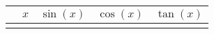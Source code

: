 \documentclass{article}
\newcommand{\trigtable}{\directlua{trigtable()}}
\begin{document}
    \begin{tabular}{rcccc}
    \hline
    & $x$ & $\sin(x)$ & $\cos(x)$ & $\tan(x)$ \\
    \hline
    \trigtable
    \hline
    \end{tabular}
\end{document}
